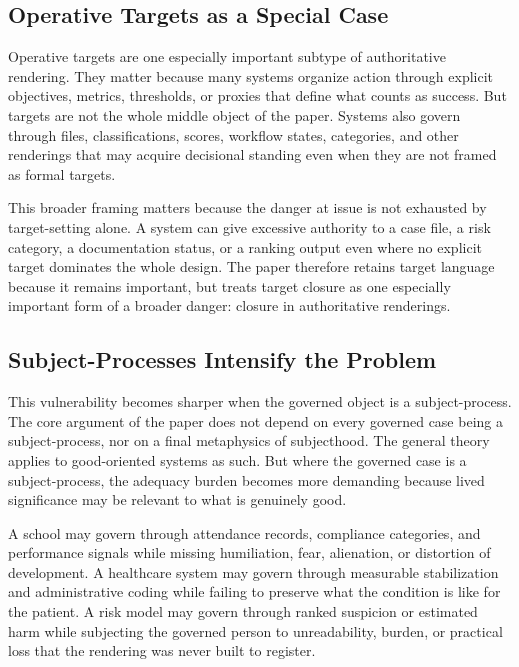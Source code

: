 \documentclass[11pt]{article}
\begin{document}
\subsection{Operative Targets as a Special Case}

Operative targets are one especially important subtype of authoritative rendering. They matter because many systems organize action through explicit objectives, metrics, thresholds, or proxies that define what counts as success. But targets are not the whole middle object of the paper. Systems also govern through files, classifications, scores, workflow states, categories, and other renderings that may acquire decisional standing even when they are not framed as formal targets.

This broader framing matters because the danger at issue is not exhausted by target-setting alone. A system can give excessive authority to a case file, a risk category, a documentation status, or a ranking output even where no explicit target dominates the whole design. The paper therefore retains target language because it remains important, but treats target closure as one especially important form of a broader danger: closure in authoritative renderings.

\subsection{Subject-Processes Intensify the Problem}

This vulnerability becomes sharper when the governed object is a subject-process. The core argument of the paper does not depend on every governed case being a subject-process, nor on a final metaphysics of subjecthood. The general theory applies to good-oriented systems as such. But where the governed case is a subject-process, the adequacy burden becomes more demanding because lived significance may be relevant to what is genuinely good.\cite{Swanson2026EmbeddedProcess,Fricker2007EpistemicInjustice}

A school may govern through attendance records, compliance categories, and performance signals while missing humiliation, fear, alienation, or distortion of development. A healthcare system may govern through measurable stabilization and administrative coding while failing to preserve what the condition is like for the patient. A risk model may govern through ranked suspicion or estimated harm while subjecting the governed person to unreadability, burden, or practical loss that the rendering was never built to register.
\end{document}
